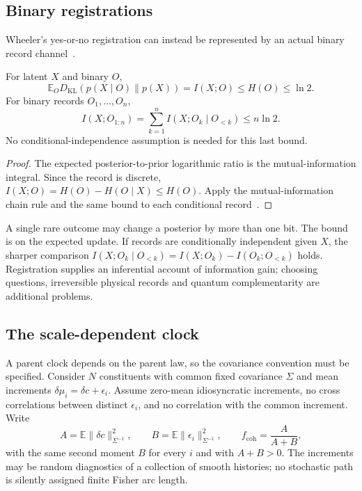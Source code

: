 \subsection{Binary registrations}\label{sec:binary_registration}
Wheeler's yes-or-no registration can instead be represented by an actual binary record channel~\cite{Wheeler1990}.
\begin{proposition}\label{prop:binary_registration}
For latent $X$ and binary $O$,
\begin{equation}
\mathbb E_O D_{\mathrm{KL}}(p(X\mid O)\|p(X))
=I(X;O)\leq H(O)\leq\ln2.
\label{eq:registration_bound}
\end{equation}
For binary records $O_1,\ldots,O_n$,
\begin{equation}
I(X;O_{1:n})=\sum_{k=1}^n I(X;O_k\mid O_{<k})\leq n\ln2.
\label{eq:registration_chain}
\end{equation}
No conditional-independence assumption is needed for this last bound.
\end{proposition}
\begin{proof}
The expected posterior-to-prior logarithmic ratio is the mutual-information integral. Since the record is discrete, $I(X;O)=H(O)-H(O\mid X)\leq H(O)$. Apply the mutual-information chain rule and the same bound to each conditional record~\cite{CoverThomas2006}.
\end{proof}
A single rare outcome may change a posterior by more than one bit. The bound is on the expected update. If records are conditionally independent given $X$, the sharper comparison
$I(X;O_k\mid O_{<k})=I(X;O_k)-I(O_k;O_{<k})$
holds. Registration supplies an inferential account of information gain; choosing questions, irreversible physical records and quantum complementarity are additional problems.

\subsection{The scale-dependent clock}\label{sec:scale_dependent_time}
A parent clock depends on the parent law, so the covariance convention must be specified. Consider $N$ constituents with common fixed covariance $\Sigma$ and mean increments
$\delta\mu_i=\delta c+\epsilon_i$. Assume zero-mean idiosyncratic increments, no cross correlations between distinct $\epsilon_i$, and no correlation with the common increment. Write
\begin{equation}
A=\mathbb E\|\delta c\|_{\Sigma^{-1}}^2,\qquad
B=\mathbb E\|\epsilon_i\|_{\Sigma^{-1}}^2,\qquad
f_{\mathrm{coh}}=\frac{A}{A+B},
\label{eq:coherent_fraction}
\end{equation}
with the same second moment $B$ for every $i$ and with $A+B>0$. The increments may be random diagnostics of a collection of smooth histories; no stochastic path is silently assigned finite Fisher arc length.

